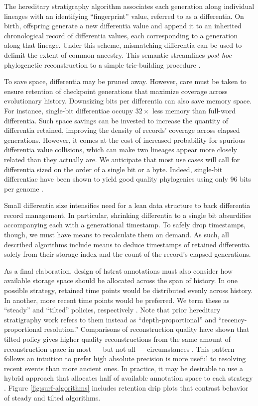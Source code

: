 The hereditary stratigraphy algorithm associates each generation along individual lineages with an identifying ``fingerprint'' value, referred to as a differentia.
On birth, offspring generate a new differentia value and append it to an inherited chronological record of differentia values, each corresponding to a generation along that lineage.
Under this scheme, mismatching differentia can be used to delimit the extent of common ancestry.
This semantic streamlines \textit{post hoc} phylogenetic reconstruction to a simple trie-building procedure
\citep{moreno2024analysis}.

To save space, differentia may be pruned away.
However, care must be taken to ensure retention of checkpoint generations that maximize coverage across evolutionary history.
Downsizing bits per differentia can also save memory space.
For instance, single-bit differentiae occupy $32\times$ less memory than full-word differentia.
Such space savings can be invested to increase the quantity of differentia retained, improving the density of records' coverage across elapsed generations.
However, it comes at the cost of increased probability for spurious differentia value collisions, which can make two lineages appear more closely related than they actually are.
We anticipate that most use cases will call for differentia sized on the order of a single bit or a byte.
Indeed, single-bit differentiae have been shown to yield good quality phylogenies using only 96 bits per genome \citep{TODOOTHERPAPER}.

Small differentia size intensifies need for a lean data structure to back differentia record management.
In particular, shrinking differentia to a single bit absurdifies accompanying each with a generational timestamp.
To safely drop timestamps, though, we must have means to recalculate them on demand.
As such, all described algorithms include means to deduce timestamps of retained differentia solely from their storage index and the count of the record's elapsed generations.

As a final elaboration, design of hstrat annotations must also consider how available storage space should be allocated across the span of history.
In one possible strategy, retained time points would be distributed evenly across history.
In another, more recent time points would be preferred.
We term these as ``steady'' and ``tilted'' policies, respectively \citep{THEPAPERWHERETHETERMSAREFROMTODO}.
Note that prior hereditary stratigraphy work refers to them instead as ``depth-proportional'' and ``recency-proportional resolution.''
Comparisons of reconstruction quality have shown that tilted policy gives higher quality reconstructions from the same amount of reconstruction space in most --- but not all --- circumstances \citep{oTHERPAPERTODO}.
This pattern follows an intuition to prefer high absolute precision is more useful to resolving recent events than more ancient ones.
In practice, it may be desirable to use a hybrid approach that allocates half of available annotation space to each strategy \citep{oTHERPAPERTODO}.
Figure \ref{fig:surf-algorithms} includes retention drip plots that contrast behavior of steady and tilted algorithms.

